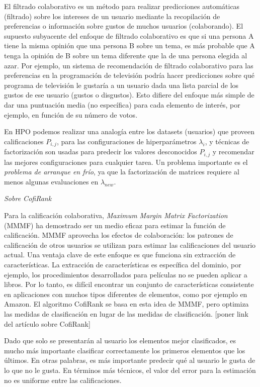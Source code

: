El filtrado colaborativo es un método para realizar predicciones automáticas (filtrado) sobre los intereses de un usuario mediante la recopilación de preferencias o información sobre gustos de muchos usuarios (colaborando). El supuesto subyacente del enfoque de filtrado colaborativo es que si una persona A tiene la misma opinión que una persona B sobre un tema, es más probable que A tenga la opinión de B sobre un tema diferente que la de una persona elegida al azar. Por ejemplo, un sistema de recomendación de filtrado colaborativo para las preferencias en la programación de televisión podría hacer predicciones sobre qué programa de televisión le gustaría a un usuario dada una lista parcial de los gustos de ese usuario (gustos o disgustos). Esto difiere del enfoque más simple de dar una puntuación media (no específica) para cada elemento de interés, por ejemplo, en función de su número de votos.

En HPO podemos realizar una analogía entre los datasets (usuarios) que proveen calificaciones $P_{i,j}$, para las configuraciones de hiperparámetros $\lambda_i$, y técnicas de factorización son usadas para predecir los valores desconocidos $P_{i,j}$ y recomendar las mejores configuraciones para cualquier tarea. Un problema importante es el \textit{problema de arranque en frío}, ya que la factorización de matrices requiere al menos algunas evaluaciones en $\lambda_{new}$.

\textit{Sobre CofiRank}

Para la calificación colaborativa, \textit{Maximum Margin Matrix Factorization} (MMMF) ha demostrado ser un medio eficaz para estimar la función de calificación. MMMF aprovecha los efectos de colaboración: los patrones de calificación de otros usuarios se utilizan para estimar las calificaciones del usuario actual. Una ventaja clave de este enfoque es que funciona sin extracción de características. La extracción de características es específica del dominio, por ejemplo, los procedimientos desarrollados para películas no se pueden aplicar a libros. Por lo tanto, es difícil encontrar un conjunto de características consistente en aplicaciones con muchos tipos diferentes de elementos, como por ejemplo en Amazon. El algoritmo CofiRank se basa en esta idea de MMMF, pero optimiza las medidas de clasificación en lugar de las medidas de clasificación. [poner link del artículo sobre CofiRank]

Dado que solo se presentarán al usuario los elementos mejor clasificados, es mucho más importante clasificar correctamente los primeros elementos que los últimos. En otras palabras, es más importante predecir qué al usuario le gusta de lo que no le gusta. En términos más técnicos, el valor del error para la estimación no es uniforme entre las calificaciones.


